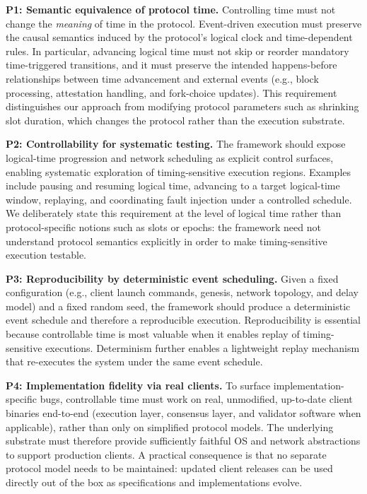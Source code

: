 \smallskip
\noindent\textbf{P1: Semantic equivalence of protocol time.}
Controlling time must not change the \emph{meaning} of time in the protocol. Event-driven execution must preserve the causal semantics induced by the protocol's logical clock and time-dependent rules.
In particular, advancing logical time must not skip or reorder mandatory time-triggered transitions, and it must preserve the intended happens-before relationships between time advancement and external events (e.g., block processing, attestation handling, and fork-choice updates).
This requirement distinguishes our approach from modifying protocol parameters such as shrinking slot duration, which changes the protocol rather than the execution substrate.
  
\smallskip
\noindent\textbf{P2: Controllability for systematic testing.}
The framework should expose logical-time progression and network scheduling as explicit control surfaces, enabling systematic exploration of timing-sensitive execution regions.
Examples include pausing and resuming logical time, advancing to a target logical-time window, replaying, and coordinating fault injection under a controlled schedule.
We deliberately state this requirement at the level of logical time rather than protocol-specific notions such as slots or epochs: the framework need not understand protocol semantics explicitly in order to make timing-sensitive execution testable.
  
\smallskip
\noindent\textbf{P3: Reproducibility by deterministic event scheduling.}
Given a fixed configuration (e.g., client launch commands, genesis, network topology, and delay model) and a fixed random seed, the framework should produce a deterministic event schedule and therefore a reproducible execution.
Reproducibility is essential because controllable time is most valuable when it enables replay of timing-sensitive executions. Determinism further enables a lightweight replay mechanism that re-executes the system under the same event schedule.
  
\smallskip
\noindent\textbf{P4: Implementation fidelity via real clients.}
To surface implementation-specific bugs, controllable time must work on real, unmodified, up-to-date client binaries end-to-end (execution layer, consensus layer, and validator software when applicable), rather than only on simplified protocol models.
The underlying substrate must therefore provide sufficiently faithful OS and network abstractions to support production clients. A practical consequence is that no separate protocol model needs to be maintained: updated client releases can be used directly out of the box as specifications and implementations evolve.
  

